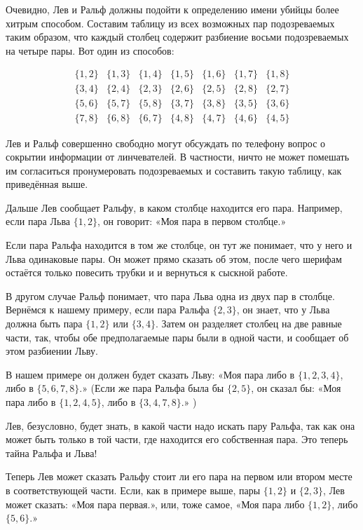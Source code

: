 Очевидно, Лев и Ральф должны подойти к определению имени убийцы более хитрым способом.
Составим таблицу из всех возможных пар подозреваемых таким образом, что каждый столбец содержит разбиение восьми подозреваемых на четыре пары.
Вот один из способов:

\[
\begin{matrix}
\{1,2\}&\{1,3\}&\{1,4\}&\{1,5\}&\{1,6\}&\{1,7\}&\{1,8\}
\\
\{3,4\}&\{2,4\}&\{2,3\}&\{2,6\}&\{2,5\}&\{2,8\}&\{2,7\}
\\
\{5,6\}&\{5,7\}&\{5,8\}&\{3,7\}&\{3,8\}&\{3,5\}&\{3,6\}
\\
\{7,8\}&\{6,8\}&\{6,7\}&\{4,8\}&\{4,7\}&\{4,6\}&\{4,5\}
\end{matrix}
\]


Лев и Ральф совершенно свободно могут обсуждать по телефону вопрос о сокрытии информации от линчевателей.
В частности, ничто не может помешать им согласиться пронумеровать подозреваемых и составить такую таблицу, как приведённая выше.

Дальше Лев сообщает Ральфу, в каком столбце находится его пара.
Например, если пара Льва $\{1,2\}$, он говорит: «Моя пара в первом столбце.» 

Если пара Ральфа находится в том же столбце, он тут же понимает, что у него и Льва одинаковые пары.
Он может прямо сказать об этом, после чего шерифам остаётся только повесить трубки и и вернуться к сыскной работе.

В другом случае Ральф понимает, что пара Льва одна из двух пар в столбце.
Вернёмся к нашему примеру, если пара Ральфа $\{2,3\}$, он знает, что у Льва должна быть пара $\{1,2\}$ или $\{3,4\}$.
Затем он разделяет столбец на две равные части, так, чтобы обе предполагаемые пары были в одной части, и сообщает об этом разбиении Льву.

В нашем примере он должен будет сказать Льву: «Моя пара либо в $\{1,2,3,4\}$, либо в $\{5,6,7,8\}$.» (Если же пара Ральфа была бы $\{2,5\}$, он сказал бы: «Моя пара либо в $\{1,2,4,5\}$, либо в $\{3,4,7,8\}$.» )

Лев, безусловно, будет знать, в какой части надо искать пару Ральфа, так как она может быть только в той части, где находится его собственная пара.
Это теперь тайна Ральфа и Льва!

Теперь Лев может сказать Ральфу стоит ли его пара на первом или втором месте в соответствующей части.
Если, как в примере выше, пары $\{1,2\}$ и $\{2,3\}$, Лев может сказать: «Моя пара первая.», или, тоже самое, «Моя пара либо $\{1,2\}$, либо $\{5,6\}$.»


